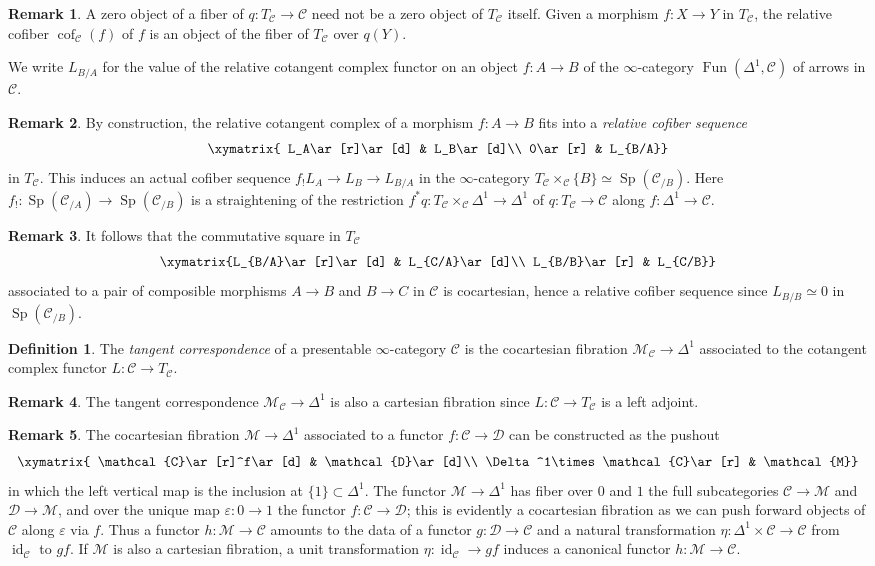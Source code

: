 \documentclass{article}
\theoremstyle{definition}
\newtheorem{definition}{Definition}[subsection]
\newtheorem{remark}{Remark}[subsection]
\newcommand{\C}{\mathcal{C}}
\newcommand{\D}{\mathcal{D}}
\newcommand{\M}{\mathcal{M}}
\renewcommand{\i}{\infty}
\DeclareMathOperator{\cof}{cof}
\DeclareMathOperator{\Fun}{Fun}
\DeclareMathOperator{\id}{id}
\DeclareMathOperator{\Sp}{Sp}
\renewcommand{\epsilon}{\varepsilon}
\begin{document}
\begin{remark}
A zero object of a fiber of $q:T_\C\to\C$ need not be a zero object of $T_\C$ itself.
Given a morphism $f:X\to Y$ in $T_\C$, the relative cofiber $\cof_\C(f)$ of $f$ is an object of the fiber  of $T_\C$ over $q(Y)$.
\end{remark}
We write $L_{B/A}$ for the value of the relative cotangent complex functor on an object $f:A\to B$ of the $\i$-category $\Fun(\Delta^1,\C)$ of arrows in $\C$.
\begin{remark}
By construction, the relative cotangent complex of a morphism $f:A\to B$ fits into a {\em relative cofiber sequence}
\[
\xymatrix{
L_A\ar[r]\ar[d] & L_B\ar[d]\\
0\ar[r] & L_{B/A}}
\]
in  $T_\C$.
This induces an actual cofiber sequence $f_! L_A\to L_B\to L_{B/A}$ in the $\i$-category $T_\C\times_{\C}\{B\}\simeq\Sp(\C_{/B})$.
Here $f_!:\Sp(\C_{/A})\to\Sp(\C_{/B})$ is a straightening of the restriction $f^*q:T_\C\times_\C\Delta^1\to\Delta^1$ of $q:T_\C\to\C$ along $f:\Delta^1\to\C$.
\end{remark}

\begin{remark}
It follows that the commutative square in $T_\C$
\[
\xymatrix{L_{B/A}\ar[r]\ar[d] & L_{C/A}\ar[d]\\
L_{B/B}\ar[r] & L_{C/B}}
\]
associated to a pair of composible morphisms $A\to B$ and $B\to C$ in $\C$ is cocartesian, hence a relative cofiber sequence since $L_{B/B}\simeq 0$ in $\Sp(\C_{/B})$.
\end{remark}

\begin{definition}
The {\em tangent correspondence} of a presentable $\i$-category $\C$ is the cocartesian fibration $\M_\C\to\Delta^1$ associated to the cotangent complex functor $L:\C\to T_\C$.
\end{definition}
\begin{remark}
The tangent correspondence $\M_\C\to\Delta^1$ is also a cartesian fibration since $L:\C\to T_\C$ is a left adjoint.
\end{remark}
\begin{remark}
The cocartesian fibration $\M\to\Delta^1$ associated to a functor $f:\C\to\D$ can be constructed as the pushout
\[
\xymatrix{
\C\ar[r]^f\ar[d] & \D\ar[d]\\
\Delta^1\times\C\ar[r] & \M}
\]
in which the left vertical map is the inclusion at $\{1\}\subset\Delta^1$.
The functor $\M\to\Delta^1$ has fiber over $0$ and $1$ the full subcategories $\C\to\M$ and $\D\to\M$, and over the unique map $\epsilon:0\to 1$ the functor $f:\C\to\D$; this is evidently a cocartesian fibration as we can push forward objects of $\C$ along $\epsilon$ via $f$.
Thus a functor $h:\M\to\C$ amounts to the data of a functor $g:\D\to\C$ and a natural transformation $\eta:\Delta^1\times\C\to\C$ from $\id_\C$ to $gf$.
If $\M$ is also a cartesian fibration, a unit transformation $\eta:\id_\C\to gf$ induces a canonical functor $h:\M\to\C$.
\end{remark}
\end{document}
